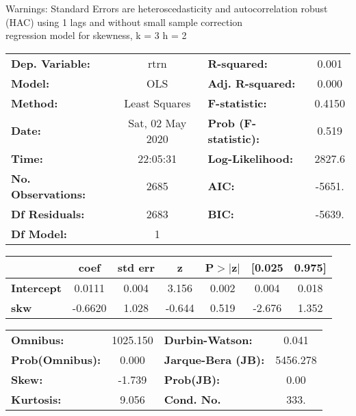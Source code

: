 Warnings: \newline
 [1] Standard Errors are heteroscedasticity and autocorrelation robust (HAC) using 1 lags and without small sample correction\\ 

regression model for skewness, k = 3 h = 2\begin{center}
\begin{tabular}{lclc}
\toprule
\textbf{Dep. Variable:}    &       rtrn       & \textbf{  R-squared:         } &     0.001   \\
\textbf{Model:}            &       OLS        & \textbf{  Adj. R-squared:    } &     0.000   \\
\textbf{Method:}           &  Least Squares   & \textbf{  F-statistic:       } &    0.4150   \\
\textbf{Date:}             & Sat, 02 May 2020 & \textbf{  Prob (F-statistic):} &    0.519    \\
\textbf{Time:}             &     22:05:31     & \textbf{  Log-Likelihood:    } &    2827.6   \\
\textbf{No. Observations:} &        2685      & \textbf{  AIC:               } &    -5651.   \\
\textbf{Df Residuals:}     &        2683      & \textbf{  BIC:               } &    -5639.   \\
\textbf{Df Model:}         &           1      & \textbf{                     } &             \\
\bottomrule
\end{tabular}
\begin{tabular}{lcccccc}
                   & \textbf{coef} & \textbf{std err} & \textbf{z} & \textbf{P$> |$z$|$} & \textbf{[0.025} & \textbf{0.975]}  \\
\midrule
\textbf{Intercept} &       0.0111  &        0.004     &     3.156  &         0.002        &        0.004    &        0.018     \\
\textbf{skw}       &      -0.6620  &        1.028     &    -0.644  &         0.519        &       -2.676    &        1.352     \\
\bottomrule
\end{tabular}
\begin{tabular}{lclc}
\textbf{Omnibus:}       & 1025.150 & \textbf{  Durbin-Watson:     } &    0.041  \\
\textbf{Prob(Omnibus):} &   0.000  & \textbf{  Jarque-Bera (JB):  } & 5456.278  \\
\textbf{Skew:}          &  -1.739  & \textbf{  Prob(JB):          } &     0.00  \\
\textbf{Kurtosis:}      &   9.056  & \textbf{  Cond. No.          } &     333.  \\
\bottomrule
\end{tabular}
\end{center}

